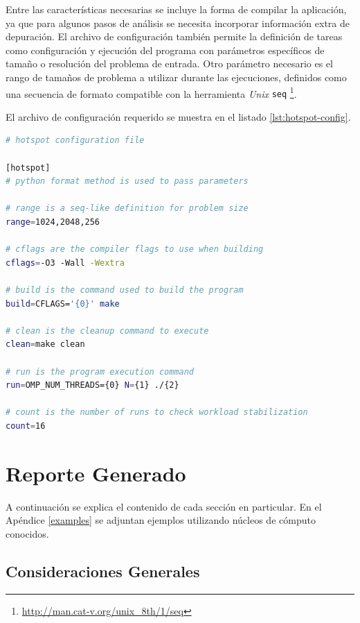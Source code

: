 \documentclass[a4paper]{report}
\begin{document}
\bigskip

Entre las características necesarias se incluye la forma de compilar la aplicación, ya que para algunos pasos de análisis se necesita incorporar información extra de depuración. El archivo de configuración también permite la definición de tareas como configuración y ejecución del programa con parámetros específicos de tamaño o resolución del problema de entrada. Otro parámetro necesario es el rango de tamaños de problema a utilizar durante las ejecuciones, definidos como una secuencia de formato compatible con la herramienta {\it Unix} {\tt seq} \footnote{\href{http://man.cat-v.org/unix\_8th/1/seq}{http://man.cat-v.org/unix\_8th/1/seq}}.

\bigskip

El archivo de configuración requerido se muestra en el listado \ref{lst:hotspot-config}.

\begin{lstlisting}[language=bash, caption={Configuración de {\tt hotspot}}, label={lst:hotspot-config}]
# hotspot configuration file

[hotspot]
# python format method is used to pass parameters

# range is a seq-like definition for problem size
range=1024,2048,256

# cflags are the compiler flags to use when building
cflags=-O3 -Wall -Wextra

# build is the command used to build the program
build=CFLAGS='{0}' make

# clean is the cleanup command to execute
clean=make clean

# run is the program execution command
run=OMP_NUM_THREADS={0} N={1} ./{2}

# count is the number of runs to check workload stabilization
count=16
\end{lstlisting}

\section{Reporte Generado}

A continuación se explica el contenido de cada sección en particular.
En el Apéndice \ref{examples} se adjuntan ejemplos utilizando núcleos de cómputo conocidos.

\subsection{Consideraciones Generales}
\end{document}
